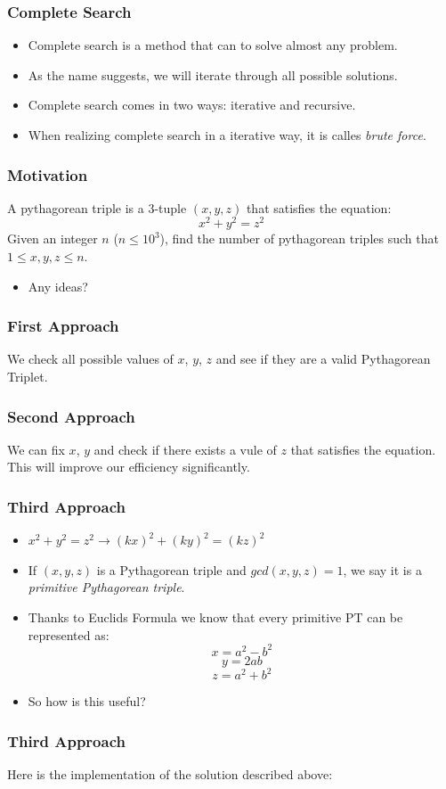 \documentclass{beamer}
\begin{document}
\begin{frame}
	\frametitle{Complete Search}

	\begin{itemize}
		\item Complete search is a method that can to solve almost any problem.
		\item As the name suggests, we will iterate through all possible solutions.
		\item Complete search comes in two ways: iterative and recursive.
		\item When realizing complete search in a iterative way, it is calles \textit{brute force}.
	\end{itemize}
\end{frame}

\begin{frame}
	\frametitle{Motivation}

	A pythagorean triple is a 3-tuple $(x,y,z)$ that satisfies the equation:
	$$x^2+y^2=z^2$$
	Given an integer $n$ ($n \leq 10^3$), find the number of pythagorean triples such that
	$1 \leq x, y, z \leq n$.

	\begin{itemize}
		\item Any ideas?
	\end{itemize}
\end{frame}

\begin{frame}[fragile]
	\frametitle{First Approach}
	
	We check all possible values of $x$, $y$, $z$ and see if they are a valid Pythagorean Triplet.

	
\end{frame}

\begin{frame}[fragile]
	\frametitle{Second Approach}
	
	We can fix $x$, $y$ and check if there exists a vule of $z$ that satisfies the equation. This will improve our efficiency significantly.

	
\end{frame}

\begin{frame}
	\frametitle{Third Approach}
	
	\begin{itemize}
		\item $x^2 + y^2 = z^2 \rightarrow (kx)^2 + (ky)^2 = (kz)^2$
		\item If $(x, y, z)$ is a Pythagorean triple and $gcd(x, y, z) = 1$, we say it is a \textit{primitive Pythagorean triple}.
		\item Thanks to Euclids Formula we know that every primitive PT can be represented as:
			$$x = a^2 - b^2$$
			$$y = 2ab$$
			$$z = a^2 + b^2$$ 
		\item So how is this useful?
	\end{itemize}
\end{frame}

\begin{frame}[fragile]
	\frametitle{Third Approach}
	Here is the implementation of the solution described above:

	
\end{frame}
\end{document}
